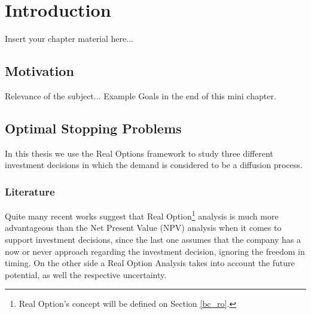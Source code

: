 
\chapter{Introduction}
\label{chapter:introduction}

Insert your chapter material here...

\section{Motivation}
\label{section:motivation}

Relevance of the subject...
Example
Goals in the end of this mini chapter.

\section{Optimal Stopping Problems}
\label{section:osp}

In this thesis we use the Real Options framework to study three different investment decisions in which the demand is considered to be a diffusion process.

\subsection{Literature}

Quite many recent works
suggest that Real Option\footnote{Real Option's concept will be defined on Section \ref{bc_ro}.} analysis is much more advantageous than the Net Present Value (NPV) analysis when it comes to support investment decisions, since the last one assumes that the company has a now or never approach regarding the investment decision, ignoring the freedom in timing.
On the other side a Real Option Analysis takes into account the future potential, as well the respective uncertainty.

